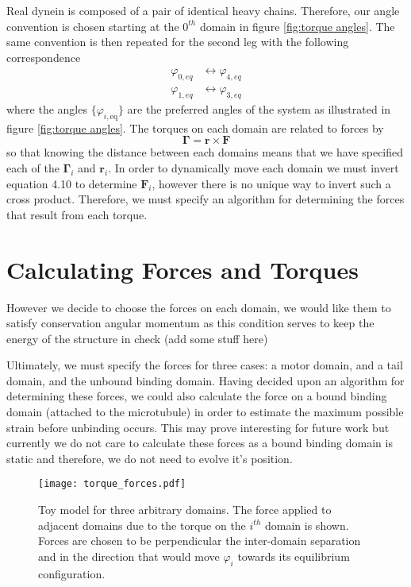 	Real dynein is composed of a pair of identical heavy chains. Therefore, our angle convention is chosen starting at the $0^{th}$ domain in figure \ref{fig:torque angles}. The same convention is then repeated for the second leg with the following correspondence 
	\begin{align}
		\varphi_{0,eq} &\longleftrightarrow \varphi_{4,eq} \\ 
		\varphi_{1,eq} &\longleftrightarrow \varphi_{3,eq}
	\end{align}
	where the angles $\{\varphi_{i, \text{eq}}\}$ are the preferred angles of the system as illustrated in figure \ref{fig:torque angles}. The torques on each domain are related to forces by 
	\begin{equation}
		\mathbf{\Gamma} = \mathbf{r}\times\mathbf{F}
	\end{equation}
	so that knowing the distance between each domains means that we have specified each of the $\mathbf{\Gamma}_i$ and $\mathbf{r}_i$. In order to dynamically move each domain we must invert equation 4.10 to determine $\mathbf{F}_i$, however there is no unique way to invert such a cross product. Therefore, we must specify an algorithm for determining the forces that result from each torque. 
	
	\section{Calculating Forces and Torques}
	However we decide to choose the forces on each domain, we would like them to satisfy  conservation angular momentum as this condition serves to keep the energy of the structure in check (add some stuff here) 
	
	Ultimately, we must specify the forces for three cases: a motor domain, and a tail domain, and the unbound binding domain. Having decided upon an algorithm for determining these forces, we could also calculate the force on a bound binding domain (attached to the microtubule) in order to estimate the maximum possible strain before unbinding occurs. This may prove interesting for future work but currently we do not care to calculate these forces as a bound binding domain is static and therefore, we do not need to evolve it's position. 
	
	\begin{figure}[!hbt]
		\centering
		\texttt{[image: torque\_forces.pdf]}
		\caption{Toy model for three arbitrary domains. The force applied to adjacent domains due to the torque on the $i^{th}$ domain is shown. Forces are chosen to be perpendicular the inter-domain separation and in the direction that would move $\varphi_i$ towards its equilibrium configuration.}
		\label{fig:torque_force}
	\end{figure}
	
